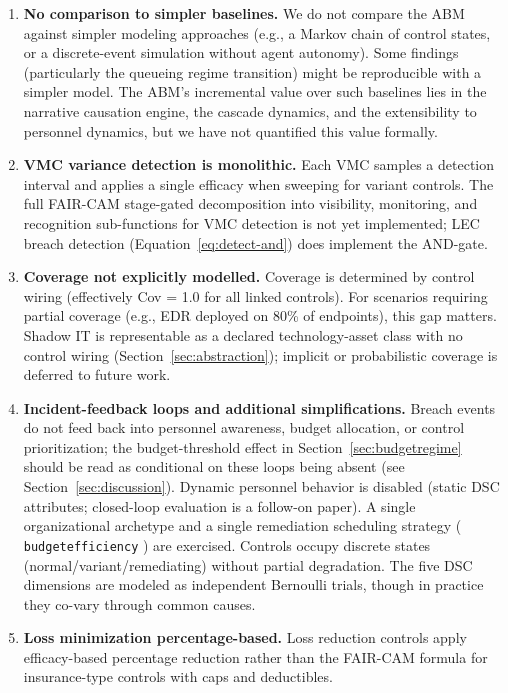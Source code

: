\documentclass[11pt,a4paper]{article}
\DeclareRobustCommand{\code}[1]{%
  \begingroup
  \def\_{\textunderscore\allowbreak}%
  \texttt{#1}%
  \endgroup}
\begin{document}
\begin{enumerate}[nosep]
    \item \textbf{No comparison to simpler baselines.} We do not compare the ABM against simpler modeling approaches (e.g., a Markov chain of control states, or a discrete-event simulation without agent autonomy). Some findings (particularly the queueing regime transition) might be reproducible with a simpler model. The ABM's incremental value over such baselines lies in the narrative causation engine, the cascade dynamics, and the extensibility to personnel dynamics, but we have not quantified this value formally.

    \item \textbf{VMC variance detection is monolithic.} Each VMC samples a detection interval and applies a single efficacy when sweeping for variant controls. The full FAIR-CAM stage-gated decomposition into visibility, monitoring, and recognition sub-functions for VMC detection is not yet implemented; LEC breach detection (Equation~\ref{eq:detect-and}) does implement the AND-gate.

    \item \textbf{Coverage not explicitly modelled.} Coverage is determined by control wiring (effectively Cov = 1.0 for all linked controls). For scenarios requiring partial coverage (e.g., EDR deployed on 80\% of endpoints), this gap matters. Shadow IT is representable as a declared technology-asset class with no control wiring (Section~\ref{sec:abstraction}); implicit or probabilistic coverage is deferred to future work.

    \item \textbf{Incident-feedback loops and additional simplifications.} Breach events do not feed back into personnel awareness, budget allocation, or control prioritization; the budget-threshold effect in Section~\ref{sec:budgetregime} should be read as conditional on these loops being absent (see Section~\ref{sec:discussion}). Dynamic personnel behavior is disabled (static DSC attributes; closed-loop evaluation is a follow-on paper). A single organizational archetype and a single remediation scheduling strategy (\code{budget\_efficiency}) are exercised. Controls occupy discrete states (normal/variant/remediating) without partial degradation. The five DSC dimensions are modeled as independent Bernoulli trials, though in practice they co-vary through common causes.

    \item \textbf{Loss minimization percentage-based.} Loss reduction controls apply efficacy-based percentage reduction rather than the FAIR-CAM formula for insurance-type controls with caps and deductibles.

\end{enumerate}
\end{document}
